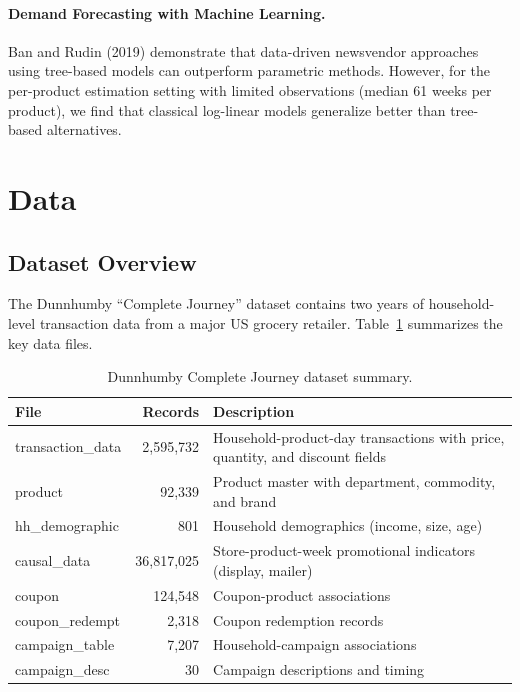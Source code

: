 \documentclass[12pt,a4paper]{article}
\begin{document}
\paragraph{Demand Forecasting with Machine Learning.}
Ban and Rudin (2019) demonstrate that data-driven newsvendor
approaches using tree-based models can outperform parametric methods.
However, for the per-product estimation setting with limited
observations (median 61 weeks per product), we find that classical
log-linear models generalize better than tree-based alternatives.

\section{Data}
\label{sec:data}

\subsection{Dataset Overview}

The Dunnhumby ``Complete Journey'' dataset contains two years of
household-level transaction data from a major US grocery retailer.
Table~\ref{tab:data-summary} summarizes the key data files.

\begin{table}[H]
\centering
\caption{Dunnhumby Complete Journey dataset summary.}
\label{tab:data-summary}
\begin{tabular}{lrp{6cm}}
\toprule
\textbf{File} & \textbf{Records} & \textbf{Description} \\
\midrule
transaction\_data & 2,595,732 & Household-product-day transactions
with price, quantity, and discount fields \\
product & 92,339 & Product master with department, commodity, and
brand \\
hh\_demographic & 801 & Household demographics (income, size, age) \\
causal\_data & 36,817,025 & Store-product-week promotional
indicators (display, mailer) \\
coupon & 124,548 & Coupon-product associations \\
coupon\_redempt & 2,318 & Coupon redemption records \\
campaign\_table & 7,207 & Household-campaign associations \\
campaign\_desc & 30 & Campaign descriptions and timing \\
\bottomrule
\end{tabular}
\end{table}
\end{document}
